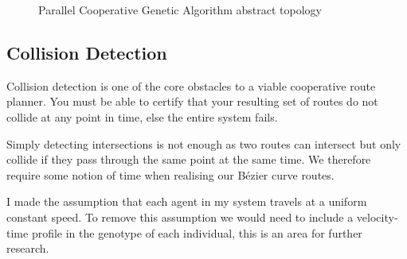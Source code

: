 \begin{figure}
  \centering
{}
\caption{\label{fig:PCGA} Parallel Cooperative Genetic Algorithm abstract topology}
\end{figure}

\subsection{Collision Detection}
\label{subsec:col-detection}

Collision detection is one of the core obstacles to a viable cooperative route planner. You must be able to certify that your resulting set of routes do not collide at any point in time, else the entire system fails.

Simply detecting intersections is not enough as two routes can intersect but only collide if they pass through the same point at the same time. We therefore require some notion of time when realising our Bézier curve routes.

I made the assumption that each agent in my system travels at a uniform constant speed. To remove this assumption we would need to include a velocity-time profile in the genotype of each individual, this is an area for further research.

